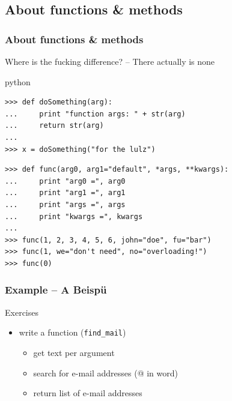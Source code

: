\documentclass{beamer}
\begin{document}
\subsection{About functions \& methods}
\begin{frame}[fragile]
	\frametitle{About functions \& methods}
	Where is the fucking difference? \pause -- There actually is none \pause
	\begin{exampleblock}{python}
	\begin{lstlisting}
>>> def doSomething(arg):
... 	print "function args: " + str(arg)
... 	return str(arg)
...
>>> x = doSomething("for the lulz")
	\end{lstlisting}
\pause	
	\begin{lstlisting}
>>> def func(arg0, arg1="default", *args, **kwargs):
... 	print "arg0 =", arg0
... 	print "arg1 =", arg1
... 	print "args =", args
... 	print "kwargs =", kwargs
...
>>> func(1, 2, 3, 4, 5, 6, john="doe", fu="bar")
>>> func(1, we="don't need", no="overloading!")
>>> func(0)
	\end{lstlisting}
	\end{exampleblock}
\end{frame}

\begin{frame}[fragile]
	\frametitle{Example -- A Beispü}
	
	\begin{block}{Exercises}
	\begin{itemize}
	\item[\checkmark] write a function (\texttt{find\_mail})
		\begin{itemize}
		\item[\checkmark] get text per argument
		\item[\checkmark] search for e-mail addresses (@ in word)
		\item[\checkmark] return list of e-mail addresses
		\end{itemize}
	\end{itemize}
	\end{block}
\end{frame}
\end{document}
